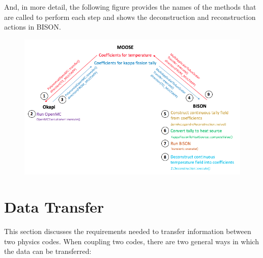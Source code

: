 \documentclass[10pt]{article}
\numberwithin{equation}{section} %
\begin{document}
And, in more detail, the following figure provides the names of the methods that are called to perform each step and shows the deconstruction and reconstruction actions in BISON.

\begin{figure}[H]
\centering
\includegraphics[width=15cm]{OpenMC-BISON-complicated.png}
\end{figure}

\section{Data Transfer}

This section discusses the requirements needed to transfer information between two physics codes. When coupling two codes, there are two general ways in which the data can be transferred:
\end{document}
